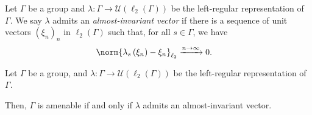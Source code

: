 \begin{definition}
  Let $\Gamma$ be a group and $\lambda\colon \Gamma\rightarrow \mathcal{U}\left( \ell_2\left( \Gamma \right) \right)$ be the left-regular representation of $\Gamma$. We say $\lambda$ admits an \textit{almost-invariant vector} if there is a sequence of unit vectors $\left( \xi_n \right)_n$ in $\ell_2\left( \Gamma \right)$ such that, for all $s\in\Gamma$, we have
  \begin{align*}
    \norm{\lambda_s\left( \xi_n \right) - \xi_n}_{\ell_2} &\xrightarrow{n\rightarrow\infty} 0.
  \end{align*}
\end{definition}
\begin{theorem}\label{thm:almost_invariant_vector}
  Let $\Gamma$ be a group, and $\lambda\colon \Gamma\rightarrow \mathcal{U}\left( \ell_2\left( \Gamma \right) \right)$ be the left-regular representation of $\Gamma$.\newline

  Then, $\Gamma$ is amenable if and only if $\lambda$ admits an almost-invariant vector.
\end{theorem}
